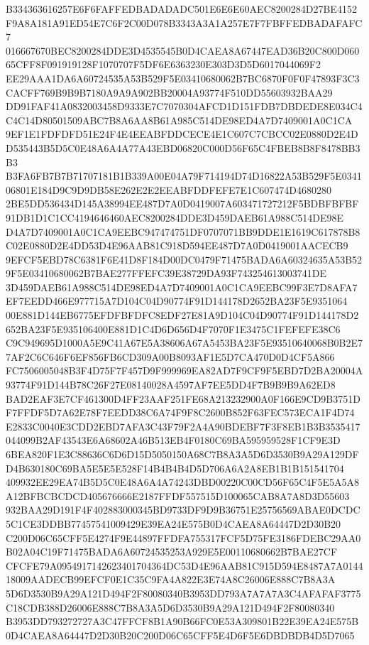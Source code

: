 \documentclass[UTF8,fontset=fandol,zihao=-4,a4paper]{ctexart}
\begin{document}
{{B334363616257E6F6FAFFEDBADADADC501E6E6E60AEC8200284D27BE4152F9A8A181A91ED54E7C6F2C00D078B3343A3A1A257E7F7FBFFEDBADAFAFC7
016667670BEC8200284DDE3D4535545B0D4CAEA8A67447EAD36B20C800D06065CFF8F091919128F1070707F5DF6E6363230E303D3D5D6017044069F2
EE29AAA1DA6A60724535A53B529F5E03410680062B7BC6870F0F0F47893F3C3CACFF769B9B9B7180A9A9A902BB20004A93774F510DD55603932BAA29
DD91FAF41A0832003458D9333E7C7070304AFCD1D151FDB7DBDEDE8E034C4C4C14D80501509ABC7B8A6AA8B61A985C514DE98ED4A7D7409001A0C1CA
9EF1E1FDFDFD51E24F4E4EEABFDDCECE4E1C607C7CBCC02E0880D2E4DD535443B5D5C0E48A6A4A77A43EBD06820C000D56F65C4FBEB8B8F8478BB3B3
B3FA6FB7B7B71707181B1B339A00E04A79F714194D74D16822A53B529F5E034106801E184D9C9D9DB58E262E2E2EEABFDDFEFE7E1C607474D4680280
2BE5DD536434D145A38994EE487D7A0D0419007A603471727212F5BDBFBFBF91DB1D1C1CC4194646460AEC8200284DDE3D459DAEB61A988C514DE98E
D4A7D7409001A0C1CA9EEBC947474751DF0707071BB9DDE1E1619C617878B8C02E0880D2E4DD53D4E96AAB81C918D594EE487D7A0D0419001AACECB9
9EFCF5EBD78C6381F6E41D8F184D00DC0479F71475BADA6A60324635A53B529F5E03410680062B7BAE277FFEFC39E38729DA93F743254613003741DE
3D459DAEB61A988C514DE98ED4A7D7409001A0C1CA9EEBC99F3E7D8AFA7EF7EEDD466E977715A7D104C04D90774F91D144178D2652BA23F5E9351064
00E881D144EB6775EFDFBFDFC8EDF27E81A9D104C04D90774F91D144178D2652BA23F5E935106400E881D1C4D6D656D4F7070F1E3475C1FEFEFE38C6
C9C949695D1000A5E9C41A67E5A38606A67A5453BA23F5E93510640068B0B2E77AF2C6C646F6EF856FB6CD309A00B8093AF1E5D7CA470D0D4CF5A866
FC7506005048B3F4D75F7F457D9F999969EA82AD7F9CF9F5EBD7D2BA20004A93774F91D144B78C26F27E08140028A4597AF7EE5DD4F7B9B9B9A62ED8
BAD2EAF3E7CF461300D4FF23AAF251FE68A213232900A0F166E9CD9B3751DF7FFDF5D7A62E78F7EEDD38C6A74F9F8C2600B852F63FEC573ECA1F4D74
E2833C0040E3CDD2EBD7AFA3C43F79F2A4A90BDEBF7F3F8EB1B3B3535417044099B2AF43543E6A68602A46B513EB4F0180C69BA595959528F1CF9E3D
6BEA820F1E3C88636C6D6D15D5050150A68C7B8A3A5D6D3530B9A29A129DFD4B630180C69BA5E5E5E528F14B4B4B4D5D706A6A2A8EB1B1B151541704
409932EE29EA74B5D5C0E48A6A4A74243DBD00220C00CD56F65C4F5E5A5A8A12BFBCBCDCD405676666E2187FFDF557515D100065CAB8A7A8D3D55603
932BAA29D191F4F402883000345BD9733DF9D9B36751E25756569ABAE0DCDC5C1CE3DDBB77457541009429E39EA24E575B0D4CAEA8A64447D2D30B20
C200D06C65CFF5E4274F9E44897FFDFA755317FCF5D75FE3186FDEBC29AA0B02A04C19F71475BADA6A60724535253A929E5E00110680662B7BAE27CF
CFCFE79A0954917142623401704364DC53D4E96AAB81C915D594E8487A7A014418009AADECB99EFCF0E1C35C9FA4A822E3E74A8C26006E888C7B8A3A
5D6D3530B9A29A121D494F2F80080340B3953DD793A7A7A7A3C4AFAFAF3775C18CDB388D26006E888C7B8A3A5D6D3530B9A29A121D494F2F80080340
B3953DD793272727A3C47FFCF8B1A90B66FC0E53A309801B22E39EA24E575B0D4CAEA8A64447D2D30B20C200D06C65CFF5E4D6F5E6DBDBDB4D5D7065
}}
\end{document}
